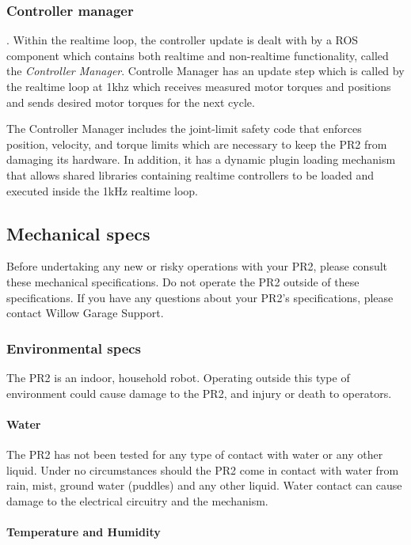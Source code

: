 \subsubsection{Controller manager}.  
Within the realtime loop, the controller update is dealt with by a ROS component which contains both realtime and non-realtime functionality,
called the \emph{Controller Manager}.  Controlle Manager has an update step which
is called by the realtime loop at 1khz which receives measured motor torques and positions and sends
desired motor torques for the next cycle.

The Controller Manager includes the joint-limit safety code that enforces position, velocity, and torque limits
which are necessary to keep the PR2 from damaging its hardware.  In addition, it has a
dynamic plugin loading mechanism that allows shared libraries containing realtime controllers to be loaded
and executed inside the 1kHz realtime loop.

\subsection{Mechanical specs}

Before undertaking any new or risky operations with your PR2, please consult
these mechanical specifications. Do not operate the PR2 outside of these
specifications. If you have any questions about your PR2's specifications,
please contact Willow Garage Support.

\subsubsection{Environmental specs}

The PR2 is an indoor, household robot. Operating outside this type of environment could cause damage to the PR2, and  injury or death to operators.

\paragraph{Water}

The PR2 has not been tested for any type of contact with water or any other
liquid. Under no circumstances should the PR2 come in contact with water from
rain, mist, ground water (puddles) and any other liquid. Water contact can cause
damage to the electrical circuitry and the mechanism.

\paragraph{Temperature and Humidity}

